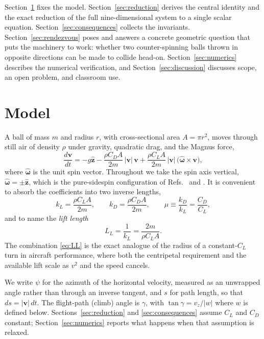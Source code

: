 \documentclass[aip,amsmath,amssymb,preprint,floatfix]{revtex4-2}
\newcommand{\kL}{k_{L}}
\newcommand{\kD}{k_{D}}
\newcommand{\LL}{L_{L}}
\newcommand{\vv}{\bm{v}}
\newcommand{\zhat}{\hat{\bm{z}}}
\newcommand{\omhat}{\hat{\bm{\omega}}}
\begin{document}
Section~\ref{sec:model} fixes the model. Section~\ref{sec:reduction} derives the
central identity and the exact reduction of the full nine-dimensional system to a
single scalar equation. Section~\ref{sec:consequences} collects the invariants.
Section~\ref{sec:rendezvous} poses and answers a concrete geometric question that
puts the machinery to work: whether two counter-spinning balls thrown in opposite
directions can be made to collide head-on. Section~\ref{sec:numerics} describes the
numerical verification, and Section~\ref{sec:discussion} discusses scope, an open
problem, and classroom use.

\section{Model}
\label{sec:model}

A ball of mass $m$ and radius $r$, with cross-sectional area $A=\pi r^2$, moves
through still air of density $\rho$ under gravity, quadratic drag, and the Magnus
force,
\begin{equation}
\frac{d\vv}{dt} = -g\zhat
 - \frac{\rho C_D A}{2m}\,|\vv|\,\vv
 + \frac{\rho C_L A}{2m}\,|\vv|\,\bigl(\omhat\times\vv\bigr),
\label{eq:eom}
\end{equation}
where $\omhat$ is the unit spin vector. Throughout we take the spin axis vertical,
$\omhat=\pm\zhat$, which is the pure-sidespin configuration of
Refs.~ and . It is convenient to
absorb the coefficients into two inverse lengths,
\begin{equation}
\kL=\frac{\rho C_L A}{2m},\qquad \kD=\frac{\rho C_D A}{2m},\qquad
\mu\equiv\frac{\kD}{\kL}=\frac{C_D}{C_L},
\label{eq:kdef}
\end{equation}
and to name the \emph{lift length}
\begin{equation}
\LL=\frac{1}{\kL}=\frac{2m}{\rho C_L A}.
\label{eq:LL}
\end{equation}
The combination \eqref{eq:LL} is the exact analogue of the radius of a
constant-$C_L$ turn in aircraft performance, where both the centripetal
requirement and the available lift scale as $v^2$ and the speed cancels.

We write $\psi$ for the azimuth of the horizontal velocity, measured as an unwrapped
angle rather than through an inverse tangent, and $s$ for path length, so that
$ds=|\vv|\,dt$. The flight-path (climb) angle is $\gamma$, with
$\tan\gamma=v_z/|w|$ where $w$ is defined below. Sections~\ref{sec:reduction} and
\ref{sec:consequences} assume $C_L$ and $C_D$ constant; Section~\ref{sec:numerics}
reports what happens when that assumption is relaxed.
\end{document}

